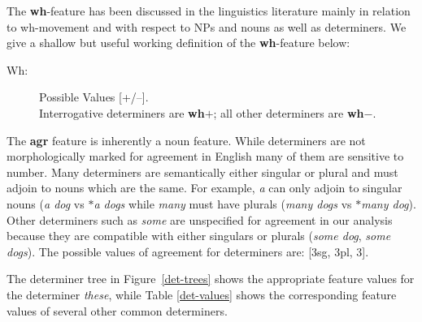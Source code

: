 The {\bf wh}-feature has been discussed in the linguistics literature mainly in relation to wh-movement and with respect to NPs and nouns as well as determiners. We give a shallow but useful working definition of the {\bf wh}-feature below:

\begin{description}

\item[Wh:]  Possible Values [+/--]. \\
Interrogative determiners are {\bf wh$+$}; all other determiners are
{\bf wh$-$}. 
\end{description}

The {\bf agr} feature is inherently a noun feature.  While determiners
are not morphologically marked for agreement in English many of them
are sensitive to number.  Many determiners are semantically either
singular or plural and must adjoin to nouns which are the same. For
example, {\it a\/} can only adjoin to singular nouns ({\it a dog\/} vs
{\it $\ast$a dogs\/} while {\it many\/} must have plurals ({\it many
dogs\/} vs {\it $\ast$many dog\/}). Other determiners such as {\it some} are
unspecified for agreement in our analysis because they are compatible
with either singulars or plurals ({\it some dog}, {\it some
dogs}). The possible values of agreement for determiners are: [3sg, 3pl, 3].




The determiner tree in Figure~\ref{det-trees} shows the appropriate
feature values for the determiner {\it these}, while Table \ref{det-values}
shows the corresponding feature values of several other common determiners.


